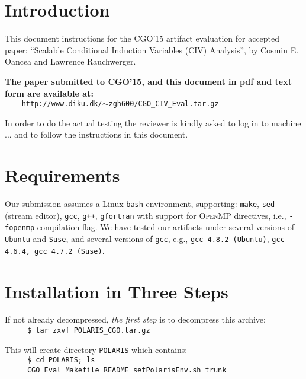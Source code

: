 \documentclass{sig-alternate}
\begin{document}




\newpage
\section{Introduction}

This document instructions for the CGO'15 artifact evaluation for accepted paper: 
``Scalable Conditional Induction Variables (CIV) Analysis'', by Cosmin E. Oancea 
and Lawrence Rauchwerger.

{\bf The paper submitted to CGO'15, and this document in pdf and text form
are available at:}\\ 
{\tt~~~~http://www.diku.dk/$\sim$zgh600/CGO\_CIV\_Eval.tar.gz}
\vspace{1ex}

In order to do the actual testing the reviewer is kindly asked to
log in to machine ... and to follow the instructions in this document.

\section{Requirements}

Our submission assumes a Linux {\tt bash} environment, supporting: 
{\tt make}, {\tt sed} (stream editor), {\tt gcc}, {\tt g++}, {\tt gfortran} 
with support for \textsc{OpenMP} directives, i.e., {\tt -fopenmp} compilation flag.
We have tested our artifacts under several versions of {\tt Ubuntu} and {\tt Suse}, 
and several versions of {\tt gcc}, e.g., {\tt gcc 4.8.2 (Ubuntu)}, {\tt gcc 4.6.4, gcc 4.7.2 (Suse)}.  


\section{Installation in Three Steps}

If not already decompressed, {\em the first step} is to decompress this archive:\\
$\mbox{ }${\tt~~~~\$ tar zxvf POLARIS\_CGO.tar.gz}\vspace{1ex}

This will create directory {\tt POLARIS} which contains:\\
$\mbox{ }${\tt~~~~\$ cd POLARIS; ls}\\
$\mbox{ }${\tt~~~~CGO\_Eval  Makefile  README  setPolarisEnv.sh  trunk}\vspace{1ex}
\end{document}

